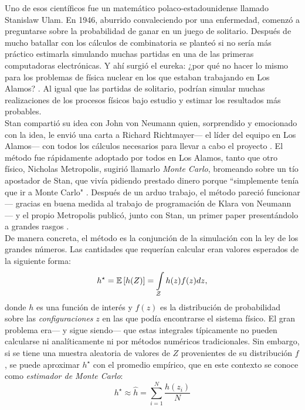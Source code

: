 Uno de esos científicos fue un matemático polaco-estadounidense llamado Stanislaw Ulam. En 1946, aburrido convaleciendo por una enfermedad, comenzó a preguntarse sobre la probabilidad de ganar en un juego de solitario. Después de mucho batallar con los cálculos de combinatoria se planteó si no sería más práctico estimarla simulando muchas partidas en una de las primeras computadoras electrónicas. Y ahí surgió el eureka: ¿por qué no hacer lo mismo para los problemas de física nuclear en los que estaban trabajando en Los Alamos? \parencite{Eckhardt87}. Al igual que las partidas de solitario, podrían simular muchas realizaciones de los procesos físicos bajo estudio y estimar los resultados más probables.\\ 

Stan compartió su idea con John von Neumann quien, sorprendido y emocionado con la idea, le envió una carta a Richard Richtmayer--- el líder del equipo en Los Alamos--- con todos los cálculos necesarios para llevar a cabo el proyecto \parencite{vonNeumann47}. El método fue rápidamente adoptado por todos en Los Alamos, tanto que otro físico, Nicholas Metropolis, sugirió llamarlo \textit{Monte Carlo}, bromeando sobre un tío apostador de Stan, que vivía pidiendo prestado dinero porque ``simplemente tenía que ir a Monte Carlo" \parencite{Metropolis87}. Después de un arduo trabajo, el método pareció funcionar--- gracias en buena medida al trabajo de programación de Klara von Neumann \parencite{Haigh14}--- y el propio Metropolis publicó, junto con Stan, un primer paper presentándolo a grandes rasgos \parencite{MetropolisUlam49}.\\

De manera concreta, el método es la conjunción de la simulación con la ley de los grandes números. Las cantidades que requerían calcular eran valores esperados de la siguiente forma: 
\begin{equation}
\label{eq:IntegralMC}
h^\star = \mathbb{E}\left[ h(Z) \right]=\int\limits_\mathcal{Z} h(z)f(z)dz ,
\end{equation} 
donde $h$ es una función de interés y $f(z)$ es la distribución de probabilidad sobre las \textit{configuraciones} $z$ en las que podía encontrarse el sistema físico. El gran problema era--- y sigue siendo--- que estas integrales típicamente no pueden calcularse ni analíticamente ni por métodos numéricos tradicionales. Sin embargo, si se tiene una muestra aleatoria de valores de $Z$ provenientes de su distribución $f$, se puede aproximar $h^\star$ con el promedio empírico, que en este contexto se conoce como \textit{estimador de Monte Carlo}: 
\begin{equation*}
h^\star \approx \hat{h} = \sum\limits_{i=1}^N \dfrac{h(z_i)}{N}
\end{equation*}

